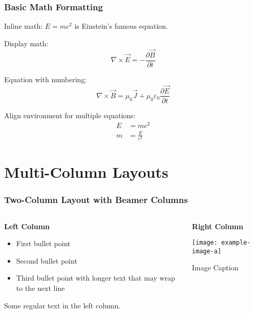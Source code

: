\documentclass[aspectratio=169,professionalfonts]{beamer}
\begin{document}
\begin{frame}
    \frametitle{Basic Math Formatting}
    
    Inline math: $E = mc^2$ is Einstein's famous equation.
    
    Display math:
    \[
    \nabla \times \vec{E} = -\frac{\partial \vec{B}}{\partial t}
    \]
    
    Equation with numbering:
    \begin{equation}
        \nabla \times \vec{B} = \mu_0 \vec{J} + \mu_0 \varepsilon_0 \frac{\partial \vec{E}}{\partial t}
    \end{equation}
    
    Align environment for multiple equations:
    \begin{align}
        E &= mc^2 \\
        m &= \frac{E}{c^2}
    \end{align}
\end{frame}

\section{Multi-Column Layouts}

\begin{frame}
    \frametitle{Two-Column Layout with Beamer Columns}
    
    \begin{columns}[T]
        \begin{column}{0.48\textwidth}
            \textbf{Left Column}
            \begin{itemize}
                \item First bullet point
                \item Second bullet point
                \item Third bullet point with longer text that may wrap to the next line
            \end{itemize}
            
            Some regular text in the left column.
        \end{column}
        
        \begin{column}{0.48\textwidth}
            \textbf{Right Column}
            
            \texttt{[image: example-image-a]}
            \centerline{\small Image Caption}
        \end{column}
    \end{columns}
\end{frame}
\end{document}
